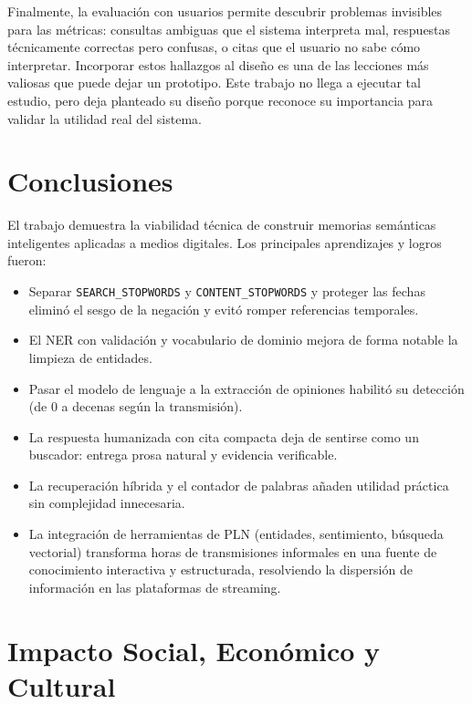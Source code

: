 \documentclass[12pt,a4paper]{article}
\begin{document}
Finalmente, la evaluación con usuarios permite descubrir problemas invisibles para las métricas: consultas ambiguas que el sistema interpreta mal, respuestas técnicamente correctas pero confusas, o citas que el usuario no sabe cómo interpretar. Incorporar estos hallazgos al diseño es una de las lecciones más valiosas que puede dejar un prototipo. Este trabajo no llega a ejecutar tal estudio, pero deja planteado su diseño porque reconoce su importancia para validar la utilidad real del sistema.


\section{Conclusiones}
\label{sec:conclusiones}

El trabajo demuestra la viabilidad técnica de construir memorias semánticas inteligentes aplicadas a medios digitales. Los principales aprendizajes y logros fueron:

\begin{itemize}
  \item Separar \texttt{SEARCH\_STOPWORDS} y \texttt{CONTENT\_STOPWORDS} y proteger las fechas eliminó el sesgo de la negación y evitó romper referencias temporales.
  \item El NER con validación y vocabulario de dominio mejora de forma notable la limpieza de entidades.
  \item Pasar el modelo de lenguaje a la extracción de opiniones habilitó su detección (de 0 a decenas según la transmisión).
  \item La respuesta humanizada con cita compacta deja de sentirse como un buscador: entrega prosa natural y evidencia verificable.
  \item La recuperación híbrida y el contador de palabras añaden utilidad práctica sin complejidad innecesaria.
  \item La integración de herramientas de PLN (entidades, sentimiento, búsqueda vectorial) transforma horas de transmisiones informales en una fuente de conocimiento interactiva y estructurada, resolviendo la dispersión de información en las plataformas de streaming.
\end{itemize}


\section{Impacto Social, Económico y Cultural}
\label{sec:impacto}
\end{document}
